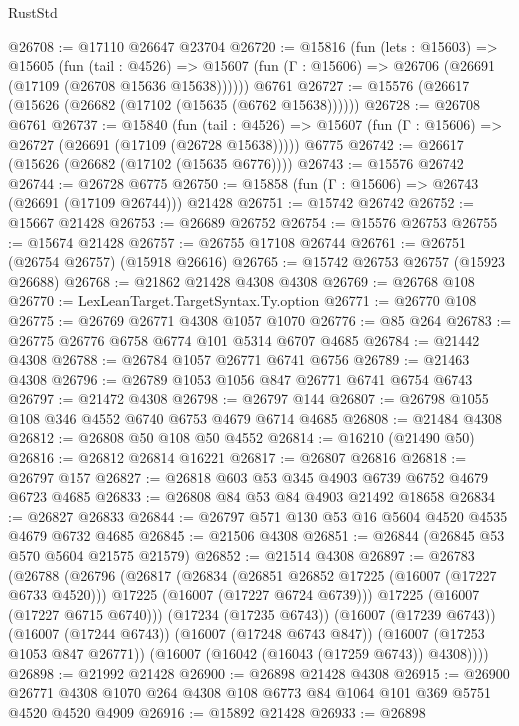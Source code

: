 \begin{lexlean}{RustStd}
\begin{coremodule}
@26708 := @17110 @26647 @23704
@26720 := @15816
    (fun (lets : @15603) =>
    @15605
      (fun (tail : @4526) =>
      @15607 (fun (Γ : @15606) => @26706 (@26691 (@17109 (@26708 @15636 @15638))))))
    @6761
@26727 := @15576 (@26617 (@15626 (@26682 (@17102 (@15635 (@6762 @15638))))))
@26728 := @26708 @6761
@26737 := @15840
    (fun (tail : @4526) => @15607 (fun (Γ : @15606) => @26727 (@26691 (@17109 (@26728 @15638)))))
    @6775
@26742 := @26617 (@15626 (@26682 (@17102 (@15635 @6776))))
@26743 := @15576 @26742
@26744 := @26728 @6775
@26750 := @15858 (fun (Γ : @15606) => @26743 (@26691 (@17109 @26744))) @21428
@26751 := @15742 @26742
@26752 := @15667 @21428
@26753 := @26689 @26752
@26754 := @15576 @26753
@26755 := @15674 @21428
@26757 := @26755 @17108 @26744
@26761 := @26751 (@26754 @26757) (@15918 @26616)
@26765 := @15742 @26753 @26757 (@15923 @26688)
@26768 := @21862 @21428 @4308 @4308
@26769 := @26768 @108
@26770 := LexLeanTarget.TargetSyntax.Ty.option
@26771 := @26770 @108
@26775 := @26769 @26771 @4308 @1057 @1070
@26776 := @85 @264
@26783 := @26775 @26776 @6758 @6774 @101 @5314 @6707 @4685
@26784 := @21442 @4308
@26788 := @26784 @1057 @26771 @6741 @6756
@26789 := @21463 @4308
@26796 := @26789 @1053 @1056 @847 @26771 @6741 @6754 @6743
@26797 := @21472 @4308
@26798 := @26797 @144
@26807 := @26798 @1055 @108 @346 @4552 @6740 @6753 @4679 @6714 @4685
@26808 := @21484 @4308
@26812 := @26808 @50 @108 @50 @4552
@26814 := @16210 (@21490 @50)
@26816 := @26812 @26814 @16221
@26817 := @26807 @26816
@26818 := @26797 @157
@26827 := @26818 @603 @53 @345 @4903 @6739 @6752 @4679 @6723 @4685
@26833 := @26808 @84 @53 @84 @4903 @21492 @18658
@26834 := @26827 @26833
@26844 := @26797 @571 @130 @53 @16 @5604 @4520 @4535 @4679 @6732 @4685
@26845 := @21506 @4308
@26851 := @26844 (@26845 @53 @570 @5604 @21575 @21579)
@26852 := @21514 @4308
@26897 := @26783
    (@26788
      (@26796
        (@26817
          (@26834
            (@26851 @26852 @17225 (@16007 (@17227 @6733 @4520)))
            @17225
            (@16007 (@17227 @6724 @6739)))
          @17225
          (@16007 (@17227 @6715 @6740)))
        (@17234 (@17235 @6743))
        (@16007 (@17239 @6743))
        (@16007 (@17244 @6743))
        (@16007 (@17248 @6743 @847))
        (@16007 (@17253 @1053 @847 @26771))
        (@16007 (@16042 (@16043 (@17259 @6743)) @4308))))
@26898 := @21992 @21428
@26900 := @26898 @21428 @4308
@26915 := @26900
    @26771
    @4308
    @1070
    @264
    @4308
    @108
    @6773
    @84
    @1064
    @101
    @369
    @5751
    @4520
    @4520
    @4909
@26916 := @15892 @21428
@26933 := @26898

\end{coremodule}
\end{lexlean}
